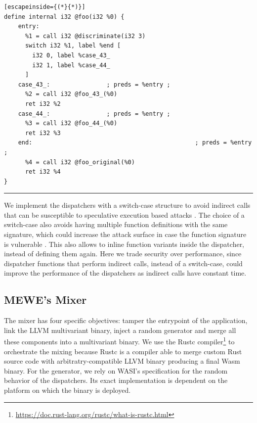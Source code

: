 \begin{code}
\scriptsize
\noindent\begin{minipage}[b]{\linewidth}
    \begin{minipage}[t]{1\linewidth}
        \begin{lstlisting}[escapeinside={(*}{*)}]
define internal i32 @foo(i32 %0) {
    entry:
      %1 = call i32 @discriminate(i32 3)
      switch i32 %1, label %end [
        i32 0, label %case_43_
        i32 1, label %case_44_
      ]
    case_43_:                ; preds = %entry ;
      %2 = call i32 @foo_43_(%0)
      ret i32 %2
    case_44_:                ; preds = %entry ;
      %3 = call i32 @foo_44_(%0)
      ret i32 %3
    end:                                              ; preds = %entry ;
      %4 = call i32 @foo_original(%0)
      ret i32 %4
}
        \end{lstlisting}
    \end{minipage}%
    
    \noindent\rule{\linewidth}{0.4pt}
    \label{listing:multivariant_template}
\end{minipage}
\end{code}

We implement the dispatchers with a switch-case structure to avoid indirect calls that can be susceptible to speculative execution based attacks \cite{Narayan2021Swivel}. 
The choice of a switch-case also avoids having multiple function definitions with the same signature, which could increase the attack surface in case the function signature is vulnerable \cite{johnson2021}.
This also allows \tool to inline function variants inside the dispatcher, instead of defining them again.
Here we trade security over performance, since dispatcher functions  that perform indirect calls, instead of a switch-case,  could improve the performance  of the dispatchers as indirect calls have constant time.


\subsection*{MEWE's Mixer}

The \tool mixer has four specific objectives: tamper the entrypoint of the application, link the LLVM multivariant binary, inject a random generator and merge all these components into a multivariant \wasm binary.
We use the Rustc compiler\footnote{\url{https://doc.rust-lang.org/rustc/what-is-rustc.html}} to orchestrate the mixing because Rustc is a compiler able to merge custom Rust source code with arbitratry-compatible LLVM binary producing a final Wasm binary.
For the generator, we rely on WASI's specification \cite{WASI} for the random behavior of the dispatchers. Its exact implementation is dependent on the platform on which the binary is deployed.

